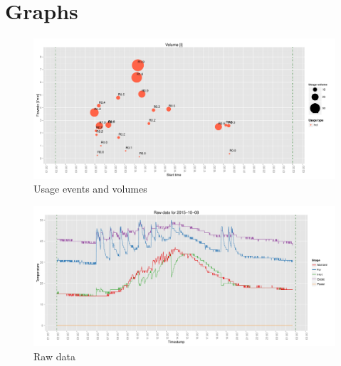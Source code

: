 \documentclass{article}\usepackage[]{graphicx}\usepackage[]{color}
\makeatletter
\def\maxwidth{ %
  \ifdim\Gin@nat@width>\linewidth
    \linewidth
  \else
    \Gin@nat@width
  \fi
}
\newenvironment{knitrout}{}{} %
\makeatother
\begin{document}
\section{Graphs}
\begin{knitrout}
\color{fgcolor}\begin{figure}[h!]

{\centering \includegraphics[width=\maxwidth]{figure/ballo0n-1} 

}

\caption[Usage events and volumes]{Usage events and volumes}\label{fig:ballo0n}
\end{figure}


\end{knitrout}

\begin{knitrout}
\color{fgcolor}\begin{figure}[h!]
\includegraphics[width=\maxwidth]{figure/raw-1} \caption[Raw data]{Raw data}\label{fig:raw}
\end{figure}


\end{knitrout}
\end{document}
